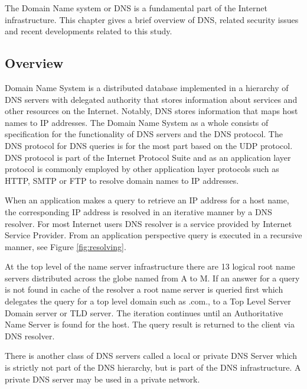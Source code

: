 The Domain Name system or DNS \cite{RFC1035}\cite{RFC1034} is a fundamental part of the Internet infrastructure. This chapter gives a brief overview of DNS, related security issues and recent developments related to this study.

\subsection{Overview}
Domain Name System is a distributed database implemented in a hierarchy of DNS servers with delegated authority that stores information about services and other resources on the Internet. Notably, DNS stores information that maps host names to IP addresses. The Domain Name System as a whole consists of specification for the functionality of DNS servers and the DNS protocol. The DNS protocol for DNS queries is for the most part based on the UDP protocol. DNS protocol is part of the Internet Protocol Suite and as an application layer protocol is commonly employed by other application layer protocols such as HTTP, SMTP or FTP to resolve domain names to IP addresses. \citep{kurose_ross}\cite{tanenbaum} 


When an application makes a query to retrieve an IP address for a host name, the corresponding IP address is resolved in an iterative manner by a DNS resolver. For most Internet users DNS resolver is a service provided by Internet Service Provider. From an application perspective query is executed in a recursive manner, see Figure \ref{fig:resolving}.  

At the top level of the name server infrastructure there are 13 logical root name servers distributed across the globe named from A to M. If an answer for a query is not found in cache of the resolver a root name server is queried first which delegates the query for a top level domain such as .com., to a Top Level Server Domain server or TLD server. The iteration continues until an Authoritative Name Server is found for the host. The query result is returned to the client via DNS resolver. \citep{kurose_ross} \cite{tanenbaum} 

There is another class of DNS servers called a local or private DNS Server which is strictly not part of the DNS hierarchy, but is part of the DNS infrastructure. A private DNS server may be used in a private network. \citep{kurose_ross}


